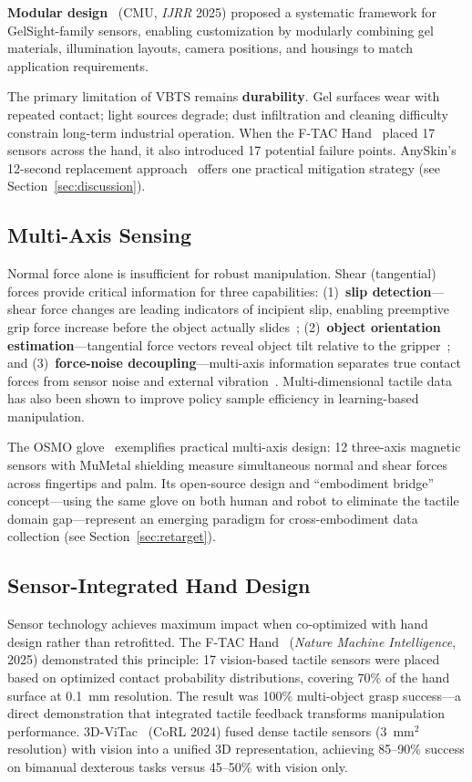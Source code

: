 \textbf{Modular design}~\cite{agarwal2025modular} (CMU, \emph{IJRR} 2025) proposed a systematic framework for GelSight-family sensors, enabling customization by modularly combining gel materials, illumination layouts, camera positions, and housings to match application requirements.

The primary limitation of VBTS remains \textbf{durability}. Gel surfaces wear with repeated contact; light sources degrade; dust infiltration and cleaning difficulty constrain long-term industrial operation. When the F-TAC Hand~\cite{zhao2025ftac} placed 17 sensors across the hand, it also introduced 17 potential failure points. AnySkin's 12-second replacement approach~\cite{bhirangi2024anyskin} offers one practical mitigation strategy (see Section~\ref{sec:discussion}).

\subsection{Multi-Axis Sensing}

Normal force alone is insufficient for robust manipulation. Shear (tangential) forces provide critical information for three capabilities: (1)~\textbf{slip detection}---shear force changes are leading indicators of incipient slip, enabling preemptive grip force increase before the object actually slides~\cite{zhao2025slip}; (2)~\textbf{object orientation estimation}---tangential force vectors reveal object tilt relative to the gripper~\cite{hossain2025multiaxis}; and (3)~\textbf{force-noise decoupling}---multi-axis information separates true contact forces from sensor noise and external vibration~\cite{cho2025decoupling}. Multi-dimensional tactile data has also been shown to improve policy sample efficiency in learning-based manipulation.

The OSMO glove~\cite{yin2025osmo} exemplifies practical multi-axis design: 12 three-axis magnetic sensors with MuMetal shielding measure simultaneous normal and shear forces across fingertips and palm. Its open-source design and ``embodiment bridge'' concept---using the same glove on both human and robot to eliminate the tactile domain gap---represent an emerging paradigm for cross-embodiment data collection (see Section~\ref{sec:retarget}).

\subsection{Sensor-Integrated Hand Design}

Sensor technology achieves maximum impact when co-optimized with hand design rather than retrofitted. The F-TAC Hand~\cite{zhao2025ftac} (\emph{Nature Machine Intelligence}, 2025) demonstrated this principle: 17 vision-based tactile sensors were placed based on optimized contact probability distributions, covering 70\% of the hand surface at 0.1~mm resolution. The result was 100\% multi-object grasp success---a direct demonstration that integrated tactile feedback transforms manipulation performance. 3D-ViTac~\cite{huang2024vitac} (CoRL 2024) fused dense tactile sensors (3~mm$^2$ resolution) with vision into a unified 3D representation, achieving 85--90\% success on bimanual dexterous tasks versus 45--50\% with vision only.

